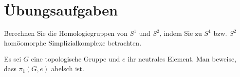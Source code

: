 \clearpage
\section*{Übungsaufgaben}

\begin{aufgabe}\label{ub7:aufg1}
    Berechnen Sie die Homologiegruppen von $S^1$ und $S^2$, indem Sie
    zu $S^1$ bzw. $S^2$ homöomorphe Simplizialkomplexe betrachten.
\end{aufgabe}

\begin{aufgabe}\label{ub7:aufg3}
    Es sei $G$ eine topologische Gruppe und $e$ ihr neutrales
    Element. Man beweise, dass $\pi_1(G,e)$ abelsch ist.
\end{aufgabe}
